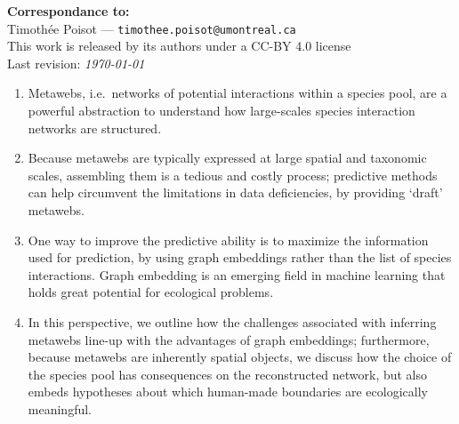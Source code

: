 \documentclass[11pt]{article}
\begin{document}
\textbf{Correspondance to:}\\
Timothée Poisot --- \texttt{timothee.poisot@umontreal.ca}\\

\vfill
This work is released by its authors under a CC-BY 4.0 license\hfill\ccby\\
Last revision: \emph{\today}

\clearpage
\thispagestyle{empty}

\vfill

\begin{enumerate}
    \item Metawebs, i.e.~networks of potential interactions within a
species pool, are a powerful abstraction to understand how large-scales
species interaction networks are structured.%
    \item Because metawebs are typically expressed at large spatial and
taxonomic scales, assembling them is a tedious and costly process;
predictive methods can help circumvent the limitations in data
deficiencies, by providing `draft' metawebs.%
    \item One way to improve the predictive ability is to maximize the
information used for prediction, by using graph embeddings rather than
the list of species interactions. Graph embedding is an emerging field
in machine learning that holds great potential for ecological problems.%
    \item In this perspective, we outline how the challenges associated
with inferring metawebs line-up with the advantages of graph embeddings;
furthermore, because metawebs are inherently spatial objects, we discuss
how the choice of the species pool has consequences on the reconstructed
network, but also embeds hypotheses about which human-made boundaries
are ecologically meaningful.%
\end{enumerate}


\vfill

\clearpage
\linenumbers
\pagestyle{normal}
\end{document}
